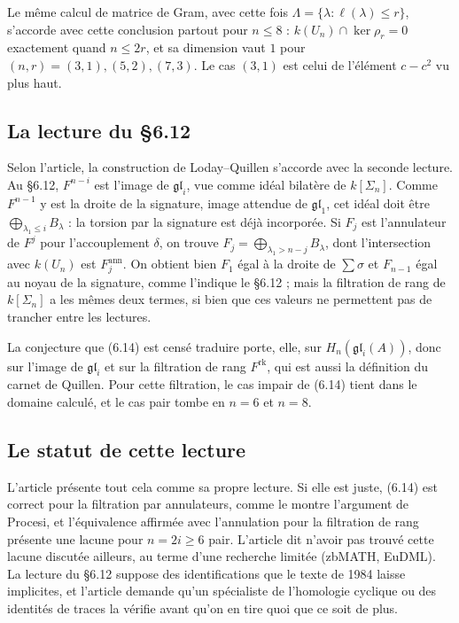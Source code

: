 \documentclass[11pt,a4paper]{amsart}
\theoremstyle{definition}
\theoremstyle{plain}
\theoremstyle{remark}
\newcommand{\gl}{\mathfrak{gl}}
\begin{document}
Le même calcul de matrice de Gram, avec cette fois $\Lambda = \{\lambda : \ell(\lambda) \le r\}$, s'accorde avec cette conclusion partout pour $n \le 8$ : $k(U_n) \cap \ker \rho_r = 0$ exactement quand $n \le 2r$, et sa dimension vaut $1$ pour $(n, r) = (3, 1), (5, 2), (7, 3)$. Le cas $(3, 1)$ est celui de l'élément $c - c^2$ vu plus haut.

\subsection{La lecture du \S6.12}

Selon l'article, la construction de Loday--Quillen s'accorde avec la seconde lecture. Au \S6.12, $F^{n-i}$ est l'image de $\gl_i$, vue comme idéal bilatère de $k[\Sigma_n]$. Comme $F^{n-1}$ y est la droite de la signature, image attendue de $\gl_1$, cet idéal doit être $\bigoplus_{\lambda_1 \le i} B_\lambda$ : la torsion par la signature est déjà incorporée. Si $F_j$ est l'annulateur de $F^j$ pour l'accouplement $\delta$, on trouve $F_j = \bigoplus_{\lambda_1 > n-j} B_\lambda$, dont l'intersection avec $k(U_n)$ est $F^{\mathrm{ann}}_j$. On obtient bien $F_1$ égal à la droite de $\sum \sigma$ et $F_{n-1}$ égal au noyau de la signature, comme l'indique le \S6.12 ; mais la filtration de rang de $k[\Sigma_n]$ a les mêmes deux termes, si bien que ces valeurs ne permettent pas de trancher entre les lectures.

La conjecture que (6.14) est censé traduire porte, elle, sur $H_n(\gl_i(A))$, donc sur l'image de $\gl_i$ et sur la filtration de rang $F^{\mathrm{rk}}$, qui est aussi la définition du carnet de Quillen. Pour cette filtration, le cas impair de (6.14) tient dans le domaine calculé, et le cas pair tombe en $n = 6$ et $n = 8$.

\subsection{Le statut de cette lecture}

L'article présente tout cela comme sa propre lecture. Si elle est juste, (6.14) est correct pour la filtration par annulateurs, comme le montre l'argument de Procesi, et l'équivalence affirmée avec l'annulation pour la filtration de rang présente une lacune pour $n = 2i \ge 6$ pair. L'article dit n'avoir pas trouvé cette lacune discutée ailleurs, au terme d'une recherche limitée (zbMATH, EuDML). La lecture du \S6.12 suppose des identifications que le texte de 1984 laisse implicites, et l'article demande qu'un spécialiste de l'homologie cyclique ou des identités de traces la vérifie avant qu'on en tire quoi que ce soit de plus.
\end{document}
